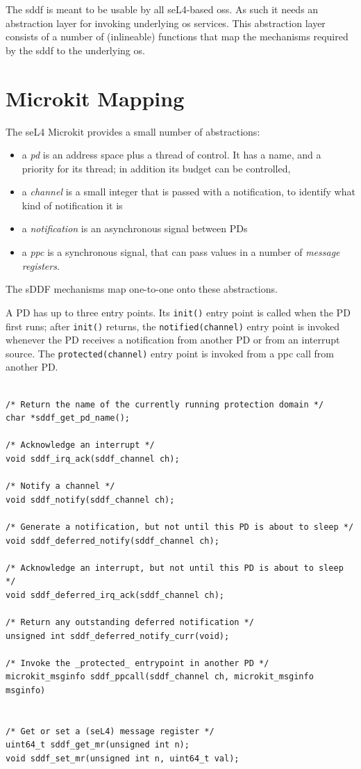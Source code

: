 \documentclass[a4paper,12pt]{report}
\begin{document}
The \gls{sddf} is meant to be usable by all seL4-based \glspl{os}. As
such it needs an abstraction layer for invoking underlying \gls{os}
services. This abstraction layer consists of a number of (inlineable)
functions that map the mechanisms required by the \gls{sddf} to the
underlying \gls{os}.

\section{Microkit Mapping}\label{s:mkal}

The seL4 Microkit provides a small number of abstractions:
\begin{itemize}
\item a \emph{\gls{pd}} is an address space plus a thread of control.  It has
  a name, and a priority for its thread; in addition its budget can be
  controlled,
\item a \emph{channel} is a small integer that is passed with a
  notification, to identify what kind of notification it is
\item a \emph{notification} is an asynchronous signal between PDs
\item a \emph{\gls{ppc}} is a synchronous signal, that can pass values
  in a number of \emph{message registers}.
\end{itemize}

The sDDF mechanisms map one-to-one onto these abstractions.

A PD has up to three entry points.  Its \texttt{init()} entry point is
called when the PD first runs; after \texttt{init()} returns, the
\texttt{notified(channel)} entry point is invoked whenever the PD
receives a notification from another PD or from an interrupt source.
The \texttt{protected(channel)} entry point is invoked from a
\gls{ppc} call from another PD.

\begin{lstlisting}[firstline=2,float=th,tabsize=2,
  label={l:sddf-interface},
  caption={sDDF interface functions.}]

/* Return the name of the currently running protection domain */
char *sddf_get_pd_name();

/* Acknowledge an interrupt */
void sddf_irq_ack(sddf_channel ch);

/* Notify a channel */
void sddf_notify(sddf_channel ch);

/* Generate a notification, but not until this PD is about to sleep */
void sddf_deferred_notify(sddf_channel ch);

/* Acknowledge an interrupt, but not until this PD is about to sleep */
void sddf_deferred_irq_ack(sddf_channel ch);

/* Return any outstanding deferred notification */
unsigned int sddf_deferred_notify_curr(void);

/* Invoke the _protected_ entrypoint in another PD */
microkit_msginfo sddf_ppcall(sddf_channel ch, microkit_msginfo msginfo)


/* Get or set a (seL4) message register */
uint64_t sddf_get_mr(unsigned int n);
void sddf_set_mr(unsigned int n, uint64_t val);
\end{lstlisting}
\end{document}
